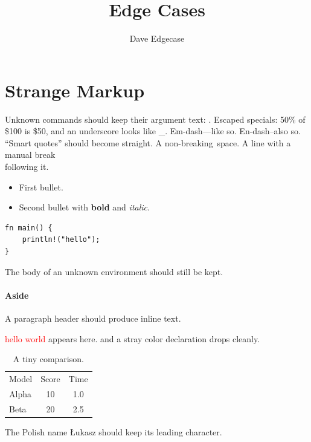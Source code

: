 \documentclass{article}
\title{Edge Cases}
\author{Dave Edgecase}
\begin{document}
\maketitle

\section{Strange Markup}
Unknown commands should keep their argument text: .
Escaped specials: 50\% of \$100 is \$50, and an underscore looks like \_.
Em-dash---like so. En-dash--also so.
``Smart quotes'' should become straight.
A non-breaking~space.
A line with a manual break\\
following it.

\begin{itemize}
  \item First bullet.
  \item Second bullet with \textbf{bold} and \emph{italic}.
\end{itemize}

\begin{verbatim}
fn main() {
    println!("hello");
}
\end{verbatim}

\begin{unknownenv}
The body of an unknown environment should still be kept.
\end{unknownenv}


\paragraph{Aside}
A paragraph header should produce inline text.

\textcolor{red}{hello world} appears here.
\color{blue} and a stray color declaration drops cleanly.

\begin{table}[h]
\caption{A tiny comparison.}
\label{tab:tiny}
\begin{tabular}{lcc}
Model & Score & Time \\
Alpha & 10 & 1.0 \\
Beta & 20 & 2.5 \\
\end{tabular}
\end{table}

The Polish name {\L}ukasz should keep its leading character.
\end{document}
